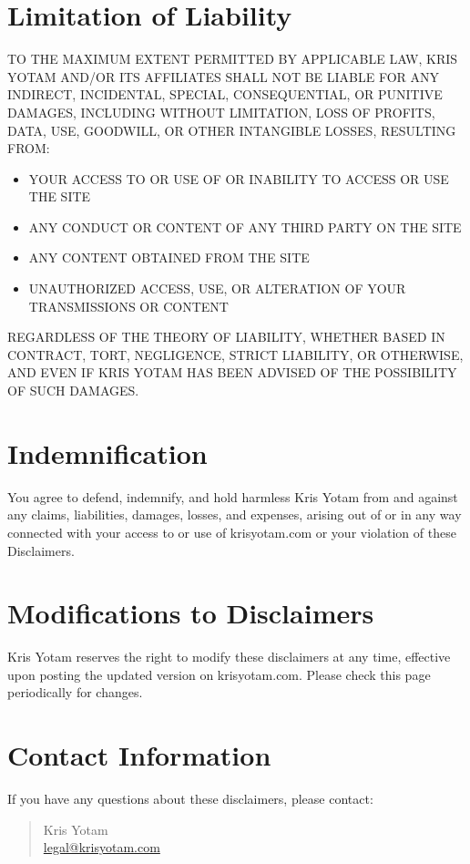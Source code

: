\documentclass[11pt]{article}
\begin{document}
\section{Limitation of Liability}
TO THE MAXIMUM EXTENT PERMITTED BY APPLICABLE LAW, KRIS YOTAM AND/OR ITS AFFILIATES SHALL NOT BE LIABLE FOR ANY INDIRECT, INCIDENTAL, SPECIAL, CONSEQUENTIAL, OR PUNITIVE DAMAGES, INCLUDING WITHOUT LIMITATION, LOSS OF PROFITS, DATA, USE, GOODWILL, OR OTHER INTANGIBLE LOSSES, RESULTING FROM:
\begin{itemize}
  \item YOUR ACCESS TO OR USE OF OR INABILITY TO ACCESS OR USE THE SITE
  \item ANY CONDUCT OR CONTENT OF ANY THIRD PARTY ON THE SITE
  \item ANY CONTENT OBTAINED FROM THE SITE
  \item UNAUTHORIZED ACCESS, USE, OR ALTERATION OF YOUR TRANSMISSIONS OR CONTENT
\end{itemize}

REGARDLESS OF THE THEORY OF LIABILITY, WHETHER BASED IN CONTRACT, TORT, NEGLIGENCE, STRICT LIABILITY, OR OTHERWISE, AND EVEN IF KRIS YOTAM HAS BEEN ADVISED OF THE POSSIBILITY OF SUCH DAMAGES.

\section{Indemnification}
You agree to defend, indemnify, and hold harmless Kris Yotam from and against any claims, liabilities, damages, losses, and expenses, arising out of or in any way connected with your access to or use of krisyotam.com or your violation of these Disclaimers.

\section{Modifications to Disclaimers}
Kris Yotam reserves the right to modify these disclaimers at any time, effective upon posting the updated version on krisyotam.com. Please check this page periodically for changes.

\section{Contact Information}
If you have any questions about these disclaimers, please contact:
\begin{quote}
  Kris Yotam\\
  \href{mailto:legal@krisyotam.com}{legal@krisyotam.com}
\end{quote}
\end{document}
